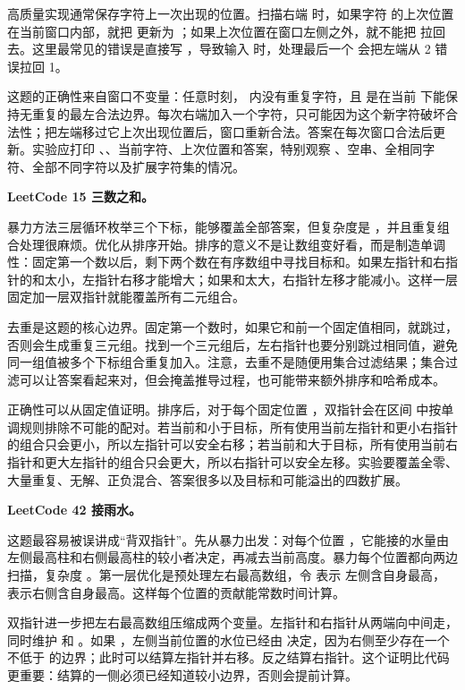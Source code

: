 高质量实现通常保存字符上一次出现的位置。扫描右端  时，如果字符  的上次位置在当前窗口内部，就把  更新为 ；如果上次位置在窗口左侧之外，就不能把  拉回去。这里最常见的错误是直接写 ，导致输入  时，处理最后一个  会把左端从 2 错误拉回 1。

这题的正确性来自窗口不变量：任意时刻， 内没有重复字符，且  是在当前  下能保持无重复的最左合法边界。每次右端加入一个字符，只可能因为这个新字符破坏合法性；把左端移过它上次出现位置后，窗口重新合法。答案在每次窗口合法后更新。实验应打印 、、当前字符、上次位置和答案，特别观察 、空串、全相同字符、全部不同字符以及扩展字符集的情况。

\noindent\textbf{LeetCode 15 三数之和。}

暴力方法三层循环枚举三个下标，能够覆盖全部答案，但复杂度是 ，并且重复组合处理很麻烦。优化从排序开始。排序的意义不是让数组变好看，而是制造单调性：固定第一个数以后，剩下两个数在有序数组中寻找目标和。如果左指针和右指针的和太小，左指针右移才能增大；如果和太大，右指针左移才能减小。这样一层固定加一层双指针就能覆盖所有二元组合。

去重是这题的核心边界。固定第一个数时，如果它和前一个固定值相同，就跳过，否则会生成重复三元组。找到一个三元组后，左右指针也要分别跳过相同值，避免同一组值被多个下标组合重复加入。注意，去重不是随便用集合过滤结果；集合过滤可以让答案看起来对，但会掩盖推导过程，也可能带来额外排序和哈希成本。

正确性可以从固定值证明。排序后，对于每个固定位置 ，双指针会在区间  中按单调规则排除不可能的配对。若当前和小于目标，所有使用当前左指针和更小右指针的组合只会更小，所以左指针可以安全右移；若当前和大于目标，所有使用当前右指针和更大左指针的组合只会更大，所以右指针可以安全左移。实验要覆盖全零、大量重复、无解、正负混合、答案很多以及目标和可能溢出的四数扩展。

\noindent\textbf{LeetCode 42 接雨水。}

这题最容易被误讲成“背双指针”。先从暴力出发：对每个位置 ，它能接的水量由左侧最高柱和右侧最高柱的较小者决定，再减去当前高度。暴力每个位置都向两边扫描，复杂度 。第一层优化是预处理左右最高数组，令  表示  左侧含自身最高， 表示右侧含自身最高。这样每个位置的贡献能常数时间计算。

双指针进一步把左右最高数组压缩成两个变量。左指针和右指针从两端向中间走，同时维护  和 。如果 ，左侧当前位置的水位已经由  决定，因为右侧至少存在一个不低于  的边界；此时可以结算左指针并右移。反之结算右指针。这个证明比代码更重要：结算的一侧必须已经知道较小边界，否则会提前计算。

